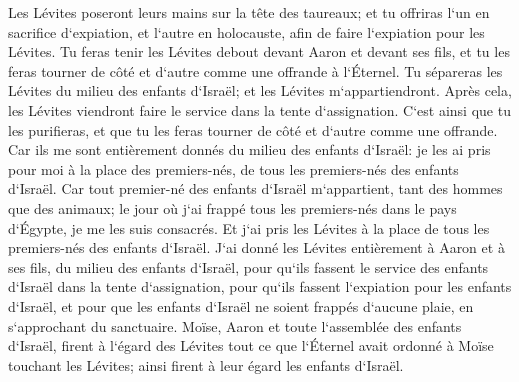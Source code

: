 \verse Les Lévites poseront leurs mains sur la tête des taureaux; et tu offriras l`un en sacrifice d`expiation, et l`autre en holocauste, afin de faire l`expiation pour les Lévites. 
\verse Tu feras tenir les Lévites debout devant Aaron et devant ses fils, et tu les feras tourner de côté et d`autre comme une offrande à l`Éternel. 
\verse Tu sépareras les Lévites du milieu des enfants d`Israël; et les Lévites m`appartiendront. 
\verse Après cela, les Lévites viendront faire le service dans la tente d`assignation. C`est ainsi que tu les purifieras, et que tu les feras tourner de côté et d`autre comme une offrande. 
\verse Car ils me sont entièrement donnés du milieu des enfants d`Israël: je les ai pris pour moi à la place des premiers-nés, de tous les premiers-nés des enfants d`Israël. 
\verse Car tout premier-né des enfants d`Israël m`appartient, tant des hommes que des animaux; le jour où j`ai frappé tous les premiers-nés dans le pays d`Égypte, je me les suis consacrés. 
\verse Et j`ai pris les Lévites à la place de tous les premiers-nés des enfants d`Israël. 
\verse J`ai donné les Lévites entièrement à Aaron et à ses fils, du milieu des enfants d`Israël, pour qu`ils fassent le service des enfants d`Israël dans la tente d`assignation, pour qu`ils fassent l`expiation pour les enfants d`Israël, et pour que les enfants d`Israël ne soient frappés d`aucune plaie, en s`approchant du sanctuaire. 
\verse Moïse, Aaron et toute l`assemblée des enfants d`Israël, firent à l`égard des Lévites tout ce que l`Éternel avait ordonné à Moïse touchant les Lévites; ainsi firent à leur égard les enfants d`Israël. 
